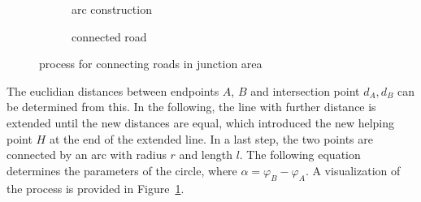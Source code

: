 \documentclass[a4paper, 10pt, conference]{ieeeconf}      %
\begin{document}
\begin{figure}[!h]
\begin{subfigure}{0.32\columnwidth}
        \caption{arc construction}
        \end{subfigure}
        \begin{subfigure}{0.32\columnwidth}
            \vspace{1cm}
        \caption{connected road}
        \end{subfigure}
        \caption{process for connecting roads in junction area}
        \label{fig_connecting_road}
    \end{figure}


    The euclidian distances between endpoints \(A\), \(B\) and intersection point \(d_A, d_B\) can be determined from this. In the following, the line with further distance is extended until the new distances are equal, which introduced the new helping point \(H\) at the end of the extended line. In a last step, the two points are connected by an arc with radius \(r\) and length \(l\). The following equation determines the parameters of the circle, where \(\alpha = \varphi_B - \varphi_A\). A visualization of the process is provided in Figure~\ref{fig_connecting_road}.
\end{document}
